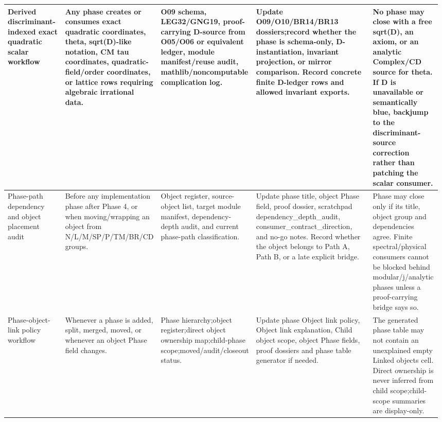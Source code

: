 \begin{longtable}{L{0.14\linewidth} L{0.19\linewidth} L{0.18\linewidth} L{0.31\linewidth} L{0.16\linewidth}}
\hline
\addlinespace[0.24em]
Derived discriminant-indexed exact quadratic scalar workflow & Any phase creates or consumes exact quadratic coordinates, theta, sqrt(D)-like notation, CM tau coordinates, quadratic-field/\allowbreak{}order coordinates, or lattice rows requiring algebraic irrational data. & O09 schema, LEG32/\allowbreak{}GNG19, proof-carrying D-source from O05/\allowbreak{}O06 or equivalent ledger, module manifest/\allowbreak{}reuse audit, mathlib/\allowbreak{}noncomputable complication log. & Update O09/\allowbreak{}O10/\allowbreak{}BR14/\allowbreak{}BR13 dossiers;\newline record whether the phase is schema-only, D-instantiation, invariant projection, or mirror comparison. Record concrete finite D-ledger rows and allowed invariant exports. & No phase may close with a free sqrt(D), an axiom, or an analytic Complex/\allowbreak{}CD source for theta. If D is unavailable or semantically blue, backjump to the discriminant-source correction rather than patching the scalar consumer.\\
\hline
\addlinespace[0.24em]
Phase-path dependency and object placement audit & Before any implementation phase after Phase 4, or when moving/\allowbreak{}wrapping an object from N/\allowbreak{}L/\allowbreak{}M/\allowbreak{}SP/\allowbreak{}P/\allowbreak{}TM/\allowbreak{}BR/\allowbreak{}CD groups. & Object register, source-object list, target module manifest, dependency-depth audit, and current phase-path classification. & Update phase title, object Phase field, proof dossier, scratchpad dependency\_depth\_audit, consumer\_contract\_direction, and no-go notes. Record whether the object belongs to Path A, Path B, or a late explicit bridge. & Phase may close only if its title, object group and dependencies agree. Finite spectral/\allowbreak{}physical consumers cannot be blocked behind modular/\allowbreak{}j/\allowbreak{}analytic phases unless a proof-carrying bridge says so.\\
\hline
\addlinespace[0.24em]
Phase-object-link policy workflow & Whenever a phase is added, split, merged, moved, or whenever an object Phase field changes. & Phase hierarchy;\newline object register;\newline direct object ownership map;\newline child-phase scope;\newline moved/\allowbreak{}audit/\allowbreak{}closeout status. & Update phase Object link policy, Object link explanation, Child object scope, object Phase fields, proof dossiers and phase table generator if needed. & The generated phase table may not contain an unexplained empty Linked objects cell. Direct ownership is never inferred from child scope;\newline child-scope summaries are display-only.\\

\end{longtable}
